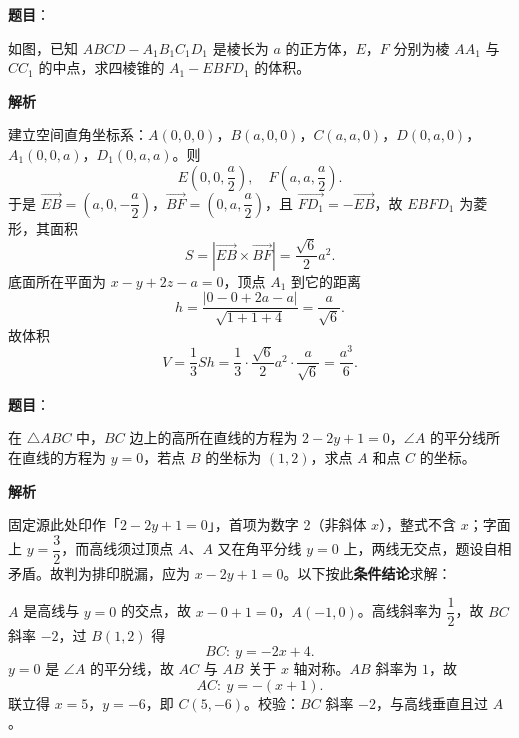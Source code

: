 \begin{answer}

\textbf{题目}：

如图，已知 \(ABCD-A_1B_1C_1D_1\) 是棱长为 \(a\) 的正方体，\(E\)，\(F\) 分别为棱 \(AA_1\) 与 \(CC_1\) 的中点，求四棱锥的 \(A_1-EBFD_1\) 的体积。
\nopagebreak[4]
\begin{center}\end{center}
\nopagebreak[4]
\textbf{解析}

建立空间直角坐标系：\(A(0,0,0)\)，\(B(a,0,0)\)，\(C(a,a,0)\)，\(D(0,a,0)\)，\(A_1(0,0,a)\)，\(D_1(0,a,a)\)。则
\nopagebreak[4]
\[
E\left(0,0,\frac a2\right),\quad F\left(a,a,\frac a2\right).
\]
于是 \(\overrightarrow{EB}=\left(a,0,-\dfrac a2\right)\)，\(\overrightarrow{BF}=\left(0,a,\dfrac a2\right)\)，且 \(\overrightarrow{FD_1}=-\overrightarrow{EB}\)，故 \(EBFD_1\) 为菱形，其面积
\nopagebreak[4]
\[
S=\left|\overrightarrow{EB}\times\overrightarrow{BF}\right|
=\frac{\sqrt6}{2}a^2.
\]
底面所在平面为 \(x-y+2z-a=0\)，顶点 \(A_1\) 到它的距离
\nopagebreak[4]
\[
h=\frac{|0-0+2a-a|}{\sqrt{1+1+4}}=\frac{a}{\sqrt6}.
\]
故体积
\nopagebreak[4]
\[
V=\frac13Sh=\frac13\cdot\frac{\sqrt6}{2}a^2\cdot\frac{a}{\sqrt6}=\frac{a^3}{6}.
\]


\end{answer}
\begin{answer}

\textbf{题目}：

在 \(\triangle ABC\) 中，\(BC\) 边上的高所在直线的方程为 \(2-2y+1=0\)，\(\angle A\) 的平分线所在直线的方程为 \(y=0\)，若点 \(B\) 的坐标为 \((1,2)\)，求点 \(A\) 和点 \(C\) 的坐标。

\textbf{解析}

固定源此处印作「\(2-2y+1=0\)」，首项为数字 2（非斜体 \(x\)），整式不含 \(x\)；字面上 \(y=\dfrac32\)，而高线须过顶点 \(A\)、\(A\) 又在角平分线 \(y=0\) 上，两线无交点，题设自相矛盾。故判为排印脱漏，应为 \(x-2y+1=0\)。以下按此\textbf{条件结论}求解：

\(A\) 是高线与 \(y=0\) 的交点，故 \(x-0+1=0\)，\(A(-1,0)\)。高线斜率为 \(\dfrac12\)，故 \(BC\) 斜率 \(-2\)，过 \(B(1,2)\) 得
\nopagebreak[4]
\[
BC:\ y=-2x+4.
\]
\(y=0\) 是 \(\angle A\) 的平分线，故 \(AC\) 与 \(AB\) 关于 \(x\) 轴对称。\(AB\) 斜率为 \(1\)，故
\nopagebreak[4]
\[
AC:\ y=-(x+1).
\]
联立得 \(x=5\)，\(y=-6\)，即 \(C(5,-6)\)。校验：\(BC\) 斜率 \(-2\)，与高线垂直且过 \(A\)。


\end{answer}
